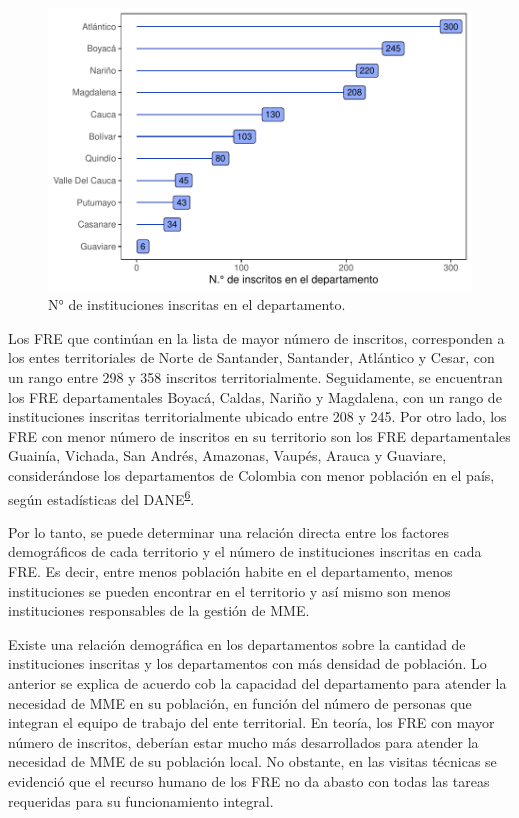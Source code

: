 \documentclass[
]{book}
\begin{document}
\begin{figure}[t]

{\centering \includegraphics[width=0.9\linewidth]{InformeFinal_files/figure-latex/institucionesInscritas-1} 

}

\caption{N° de instituciones inscritas en el departamento.}\label{fig:institucionesInscritas}
\end{figure}

Los FRE que continúan en la lista de mayor número de inscritos, corresponden a los entes territoriales de Norte de Santander, Santander, Atlántico y Cesar, con un rango entre 298 y 358 inscritos territorialmente. Seguidamente, se encuentran los FRE departamentales Boyacá, Caldas, Nariño y Magdalena, con un rango de instituciones inscritas territorialmente ubicado entre 208 y 245. Por otro lado, los FRE con menor número de inscritos en su territorio son los FRE departamentales Guainía, Vichada, San Andrés, Amazonas, Vaupés, Arauca y Guaviare, considerándose los departamentos de Colombia con menor población en el país, según estadísticas del DANE\textsuperscript{\protect\hyperlink{ref-DANE2021}{6}}.

Por lo tanto, se puede determinar una relación directa entre los factores demográficos de cada territorio y el número de instituciones inscritas en cada FRE. Es decir, entre menos población habite en el departamento, menos instituciones se pueden encontrar en el territorio y así mismo son menos instituciones responsables de la gestión de MME.

Existe una relación demográfica en los departamentos sobre la cantidad de instituciones inscritas y los departamentos con más densidad de población. Lo anterior se explica de acuerdo cob la capacidad del departamento para atender la necesidad de MME en su población, en función del número de personas que integran el equipo de trabajo del ente territorial. En teoría, los FRE con mayor número de inscritos, deberían estar mucho más desarrollados para atender la necesidad de MME de su población local. No obstante, en las visitas técnicas se evidenció que el recurso humano de los FRE no da abasto con todas las tareas requeridas para su funcionamiento integral.
\end{document}
